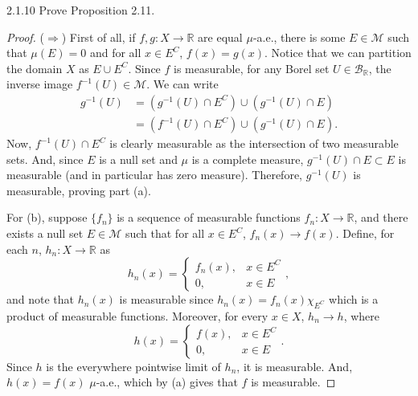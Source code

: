 \documentclass[11pt]{article}
\begin{document}
\begin{problem}{2.1.10}
	Prove Proposition 2.11.
\end{problem}
\begin{proof}
	(\(\Rightarrow\)) First of all, if \( f,g : X \rightarrow \mathbb{R} \) are equal \( \mu \)-a.e., there is some \( E \in \mathcal{M} \) such that \( \mu(E) = 0 \) and for all \( x \in E^C  \), \( f(x) = g(x) \).
	Notice that we can partition the domain \( X \) as \( E \cup E^C  \).
	Since \( f \) is measurable, for any Borel set \( U \in \mathcal{B}_{\mathbb{R}} \), the inverse image \( f^{-1}(U) \in \mathcal{M}  \).
	We can write
	\begin{equation}
		\label{eq:8}
		\begin{aligned}
			g^{-1}(U) & = (g^{-1}(U) \cap E^{C} )  \cup (g^{-1}(U) \cap E) \\
			          & = (f^{-1}(U) \cap E^C)  \cup (g^{-1}(U) \cap E).
		\end{aligned}
	\end{equation}
	Now, \( f^{-1}(U) \cap E^C \) is clearly measurable as the intersection of two measurable sets.
	And, since \( E \) is a null set and \( \mu \) is a complete measure, \( g^{-1}(U) \cap E \subset E \) is measurable (and in particular has zero measure).
	Therefore, \( g^{-1}(U) \) is measurable, proving part (a).

	For (b), suppose \( \{f_n\} \) is a sequence of measurable functions \( f_n: X \rightarrow \mathbb{R} \), and there exists a null set \( E \in \mathcal{M} \) such that for all \( x \in E^C \), \( f_n(x) \rightarrow f(x) \).
  Define, for each \( n \), \( h_{n}: X \rightarrow \mathbb{R} \) as
  \begin{equation}
  \label{eq:9}
  h_n(x) = \begin{cases}
    f_n(x), & x \in E^C \\
    0, & x \in E
  \end{cases},
\end{equation}
and note that \( h_n(x) \) is measurable since \( h_n(x) = f_n(x)\chi_{E^C} \) which is a product of measurable functions.
Moreover, for every \( x \in X \), \( h_n \rightarrow h \), where
\begin{equation}
\label{eq:10}
h(x) = \begin{cases}
  f(x), & x \in E^C \\
  0, & x \in E
\end{cases}.
\end{equation}
Since \( h \) is the everywhere pointwise limit of \( h_n \), it is measurable.
And, \( h(x) = f(x) \) \(\mu\)-a.e., which by (a) gives that \( f \) is measurable.


\end{proof}
\end{document}
